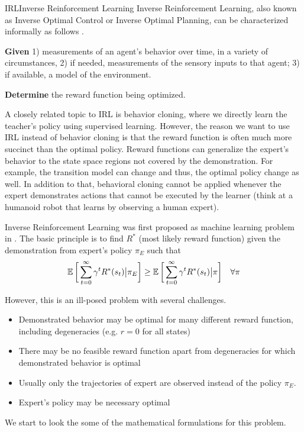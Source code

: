 \documentclass[9pt]{article}
\begin{document}
\begin{topic}{IRL}{Inverse Reinforcement Learning}  Inverse Reinforcement Learning, also known as Inverse Optimal Control or Inverse Optimal Planning, can be characterized informally as follows \citep{Ng2000Algorithms}.

\textbf{Given} 1) measurements of an agent's behavior over time, in a variety of circumstances, 2) if needed, measurements of the sensory inputs to that agent; 3) if available, a model of the environment.

\textbf{Determine} the reward function being optimized.

A closely related topic to IRL is behavior cloning, where we directly learn the teacher's policy using supervised learning. However, the reason we want to use IRL instead of behavior cloning is that the reward function is often much more succinct than the optimal policy. Reward functions can generalize the expert's behavior to the state space regions not covered by the demonstration. For example, the transition model can change and thus, the optimal policy change as well. In addition to that, behavioral cloning cannot be applied whenever the expert demonstrates actions that cannot be executed by the learner (think at a humanoid robot that learns by observing a human expert).

Inverse Reinforcement Learning was first proposed as machine learning problem in \citep{Ng2000Algorithms}.  The basic principle is to find $R^*$ (most likely reward function) given the demonstration from expert's policy $\pi_E$ such that
\[
	\operatorname{\mathbb{E}}\bigg[\sum_{t=0}^{\infty} \gamma^{t} R^*(s_t)\big|\pi_E\bigg] \ge \operatorname{\mathbb{E}}\bigg[\sum_{t=0}^{\infty} \gamma^{t} R^*(s_t)\big|\pi\bigg] \quad \forall \pi
\]

However, this is an ill-posed problem with several challenges. 
\begin{itemize}
\item Demonstrated behavior may be optimal for many different reward function, including degeneracies (e.g. $r = 0$ for all states)
\item There may be no feasible reward function apart from degeneracies for which demonstrated behavior is optimal
\item Usually only the trajectories of expert are observed instead of the policy $\pi_E$.
\item Expert's policy may be necessary optimal
\end{itemize}

We start to look the some of the mathematical formulations for this problem. 

\end{topic}
\end{document}
